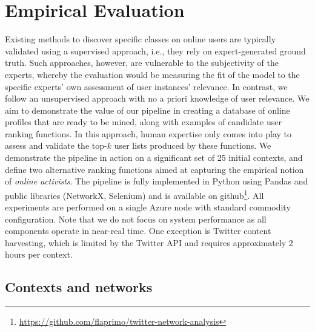 \section{Empirical Evaluation} \label{sec:evaluation}

Existing methods to discover specific classes on online users are typically validated using a supervised approach, i.e., they rely on expert-generated ground truth.
Such approaches, however, are vulnerable to the subjectivity of the experts, whereby the evaluation would be measuring the fit of the model to the specific experts' own assessment of user instances' relevance. 
In contrast, we follow an unsupervised approach with no a priori knowledge of user relevance. We aim to demonstrate the value of our pipeline in creating a database of online profiles that are ready to be mined, along with examples of candidate user ranking functions.
In this approach, human expertise only comes into play to assess and validate the top-$k$ user lists produced by these functions.
%
We  demonstrate the pipeline in action on a significant set of 25 initial contexts, and define two alternative ranking functions aimed at capturing the empirical notion of  \textit{online activists}.
%
The pipeline is fully implemented in Python using Pandas and public libraries (NetworkX, Selenium) and is available on github\footnote{ \url{https://github.com/flaprimo/twitter-network-analysis}}. 
All experiments are performed on a single Azure node with standard commodity configuration.
Note that we do not focus on system performance as all components operate in near-real time. One exception is  Twitter content harvesting, which is limited by the Twitter API and requires approximately 2 hours per context.

\subsection{Contexts and networks} \label{sec:contexts-selection}
 
